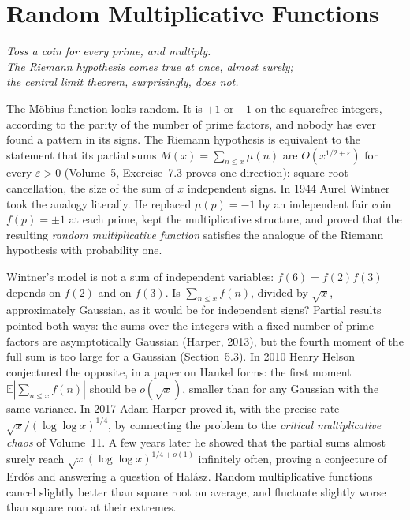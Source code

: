 \chapter{Random Multiplicative Functions}\label{ch:randommult}
\begin{center}\itshape
Toss a coin for every prime, and multiply.\\
The Riemann hypothesis comes true at once, almost surely;\\
the central limit theorem, surprisingly, does not.
\end{center}

The Möbius function looks random. It is $+1$ or $-1$ on the squarefree integers, according to the parity of the number of prime factors, and nobody has ever found a pattern in its signs. The Riemann hypothesis is equivalent to the statement that its partial sums $M(x)=\sum_{n\le x}\mu(n)$ are $O(x^{1/2+\varepsilon})$ for every $\varepsilon>0$ (Volume~5, Exercise~7.3 proves one direction): square-root cancellation, the size of the sum of $x$ independent signs. In 1944 Aurel Wintner took the analogy literally. He replaced $\mu(p)=-1$ by an independent fair coin $f(p)=\pm1$ at each prime, kept the multiplicative structure, and proved that the resulting \emph{random multiplicative function} satisfies the analogue of the Riemann hypothesis with probability one.

Wintner's model is not a sum of independent variables: $f(6)=f(2)f(3)$ depends on $f(2)$ and on $f(3)$. Is $\sum_{n\le x}f(n)$, divided by $\sqrt x$, approximately Gaussian, as it would be for independent signs? Partial results pointed both ways: the sums over the integers with a fixed number of prime factors are asymptotically Gaussian (Harper, 2013), but the fourth moment of the full sum is too large for a Gaussian (Section~5.3). In 2010 Henry Helson conjectured the opposite, in a paper on Hankel forms: the first moment $\mathbb E|\sum_{n\le x}f(n)|$ should be $o(\sqrt x)$, smaller than for any Gaussian with the same variance. In 2017 Adam Harper proved it, with the precise rate $\sqrt x/(\log\log x)^{1/4}$, by connecting the problem to the \emph{critical multiplicative chaos} of Volume~11. A few years later he showed that the partial sums almost surely reach $\sqrt x(\log\log x)^{1/4+o(1)}$ infinitely often, proving a conjecture of Erd\H{o}s and answering a question of Halász. Random multiplicative functions cancel slightly better than square root on average, and fluctuate slightly worse than square root at their extremes.

